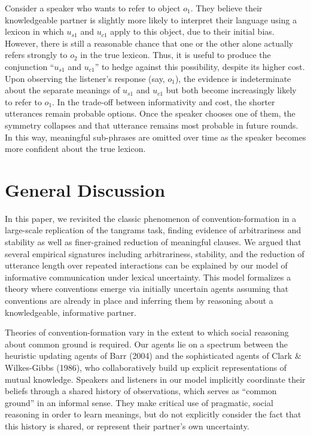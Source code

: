 \documentclass[10pt, letterpaper]{article}
\begin{document}
Consider a speaker who wants to refer to object \(o_1\). They believe
their knowledgeable partner is slightly more likely to interpret their
language using a lexicon in which \(u_{s1}\) and \(u_{c1}\) apply to
this object, due to their initial bias. However, there is still a
reasonable chance that one or the other alone actually refers strongly
to \(o_2\) in the true lexicon. Thus, it is useful to produce the
conjunction ``\(u_{s1}\) and \(u_{c1}\)'' to hedge against this
possibility, despite its higher cost. Upon observing the listener's
response (say, \(o_1\)), the evidence is indeterminate about the
separate meanings of \(u_{s1}\) and \(u_{c1}\) but both become
increasingly likely to refer to \(o_1\). In the trade-off between
informativity and cost, the shorter utterances remain probable options.
Once the speaker chooses one of them, the symmetry collapses and that
utterance remains most probable in future rounds. In this way,
meaningful sub-phrases are omitted over time as the speaker becomes more
confident about the true lexicon.

\section{General Discussion}\label{general-discussion}

In this paper, we revisited the classic phenomenon of
convention-formation in a large-scale replication of the tangrams task,
finding evidence of arbitrariness and stability as well as finer-grained
reduction of meaningful clauses. We argued that several empirical
signatures including arbitrariness, stability, and the reduction of
utterance length over repeated interactions can be explained by our
model of informative communication under lexical uncertainty. This model
formalizes a theory where conventions emerge via initially uncertain
agents assuming that conventions are already in place and inferring them
by reasoning about a knowledgeable, informative partner.

Theories of convention-formation vary in the extent to which social
reasoning about common ground is required. Our agents lie on a spectrum
between the heuristic updating agents of Barr (2004) and the
sophisticated agents of Clark \& Wilkes-Gibbs (1986), who
collaboratively build up explicit representations of mutual knowledge.
Speakers and listeners in our model implicitly coordinate their beliefs
through a shared history of observations, which serves as ``common
ground'' in an informal sense. They make critical use of pragmatic,
social reasoning in order to learn meanings, but do not explicitly
consider the fact that this history is shared, or represent their
partner's own uncertainty.
\end{document}
